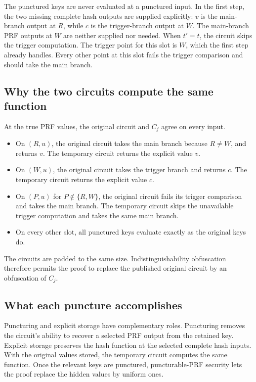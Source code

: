 \documentclass[11pt]{article}
\begin{document}
The punctured keys are never evaluated at a punctured input.  In the first
step, the two missing complete hash outputs are supplied explicitly: \(v\)
is the main-branch output at \(R\), while \(c\) is the trigger-branch output
at \(W\).  The main-branch PRF outputs at \(W\) are neither supplied nor
needed.  When \(t'=t\), the circuit skips the trigger computation.  The
trigger point for this slot is \(W\), which the first step already handles.
Every other point at this slot fails the trigger comparison and should take
the main branch.

\subsection{Why the two circuits compute the same function}

At the true PRF values, the original circuit and \(C_j\) agree on every
input.

\begin{itemize}[leftmargin=2em]
\item On \((R,u)\), the original circuit takes the main branch because
      \(R\ne W\), and returns \(v\).  The temporary circuit returns the
      explicit value \(v\).
\item On \((W,u)\), the original circuit takes the trigger branch and returns
      \(c\).  The temporary circuit returns the explicit value \(c\).
\item On \((P,u)\) for \(P\notin\{R,W\}\), the original circuit fails its
      trigger comparison and takes the main branch.  The temporary circuit
      skips the unavailable trigger computation and takes the same main
      branch.
\item On every other slot, all punctured keys evaluate exactly as the
      original keys do.
\end{itemize}

The circuits are padded to the same size.  Indistinguishability obfuscation
therefore permits the proof to replace the published original circuit by an
obfuscation of \(C_j\).

\subsection{What each puncture accomplishes}

Puncturing and explicit storage have complementary roles.  Puncturing removes
the circuit's ability to recover a selected PRF output from the retained key.
Explicit storage preserves the hash function at the selected complete hash
inputs.  With the original values stored, the temporary circuit computes the
same function.  Once the relevant keys are punctured, puncturable-PRF security
lets the proof replace the hidden values by uniform ones.
\end{document}
